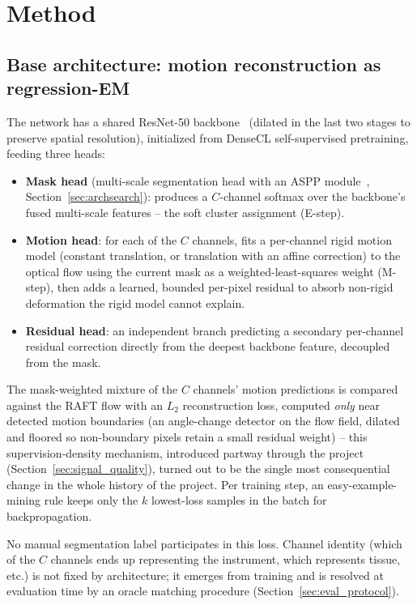 \documentclass[conference]{IEEEtran}
\begin{document}
\section{Method}

\subsection{Base architecture: motion reconstruction as regression-EM}
\label{sec:base_arch}

The network has a shared ResNet-50 backbone~\cite{resnet_cvpr2016}
(dilated in the last two stages to preserve spatial resolution),
initialized from DenseCL self-supervised pretraining, feeding three
heads:

\begin{itemize}
\item \textbf{Mask head} (multi-scale segmentation head with an ASPP
module~\cite{aspp_deeplab}, Section~\ref{sec:archsearch}): produces a
$C$-channel softmax over the backbone's fused multi-scale features -- the
soft cluster assignment (E-step).
\item \textbf{Motion head}: for each of the $C$ channels, fits a
per-channel rigid motion model (constant translation, or translation with
an affine correction) to the optical flow using the current mask as a
weighted-least-squares weight (M-step), then adds a learned, bounded
per-pixel residual to absorb non-rigid deformation the rigid model cannot
explain.
\item \textbf{Residual head}: an independent branch predicting a
secondary per-channel residual correction directly from the deepest
backbone feature, decoupled from the mask.
\end{itemize}

The mask-weighted mixture of the $C$ channels' motion predictions is
compared against the RAFT flow with an $L_2$ reconstruction loss, computed
\emph{only} near detected motion boundaries (an angle-change detector on
the flow field, dilated and floored so non-boundary pixels retain a small
residual weight) -- this supervision-density mechanism, introduced
partway through the project (Section~\ref{sec:signal_quality}), turned
out to be the single most consequential change in the whole history of
the project. Per training step, an easy-example-mining rule keeps only
the $k$ lowest-loss samples in the batch for backpropagation.

No manual segmentation label participates in this loss. Channel identity
(which of the $C$ channels ends up representing the instrument, which
represents tissue, etc.) is not fixed by architecture; it emerges from
training and is resolved at evaluation time by an oracle matching
procedure (Section~\ref{sec:eval_protocol}).
\end{document}
